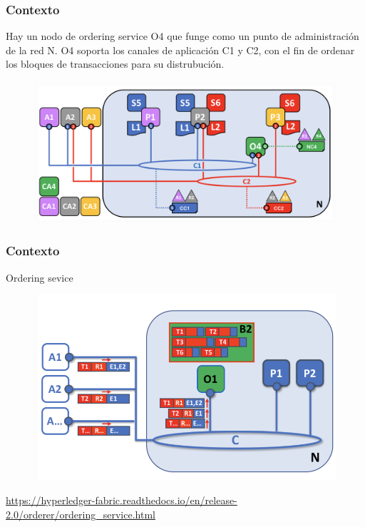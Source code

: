 \documentclass{beamer}
\begin{document}
	\begin{frame}
		\frametitle{Contexto}
		Hay un nodo de ordering service O4 que funge como un punto de administración de la red N. O4 soporta los canales de aplicación C1 y C2, con el fin de ordenar los bloques de transacciones para su distrubución.
		\begin{figure}[h]
			\includegraphics[scale=.3]{start_01}
			\centering
		\end{figure}
	\end{frame}
	
	\begin{frame}
		\frametitle{Contexto}
		Ordering sevice
		\begin{figure}[h]
			\includegraphics[scale=.5]{start_02}
			\centering
		\end{figure}
		\begin{center}
			\tiny{\url{https://hyperledger-fabric.readthedocs.io/en/release-2.0/orderer/ordering_service.html}}
		\end{center}
	\end{frame}
	
\end{document}
